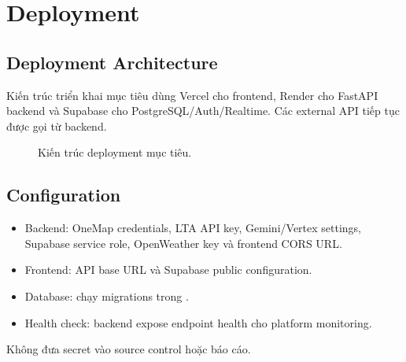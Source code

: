 \chapter{Deployment}

\section{Deployment Architecture}

Kiến trúc triển khai mục tiêu dùng Vercel cho frontend, Render cho FastAPI backend và Supabase cho PostgreSQL/Auth/Realtime. Các external API tiếp tục được gọi từ backend.

\begin{figure}[H]
\centering
{}
\caption{Kiến trúc deployment mục tiêu.}
\label{fig:deployment}
\end{figure}

\section{Configuration}

\begin{itemize}
  \item Backend: OneMap credentials, LTA API key, Gemini/Vertex settings, Supabase service role, OpenWeather key và frontend CORS URL.
  \item Frontend: API base URL và Supabase public configuration.
  \item Database: chạy migrations trong .
  \item Health check: backend expose endpoint health cho platform monitoring.
\end{itemize}

Không đưa secret vào source control hoặc báo cáo.

